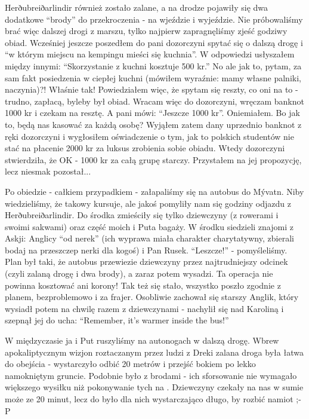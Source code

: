 Herðubreiðarlindir również zostało zalane, a na drodze pojawiły się dwa dodatkowe “brody” do przekroczenia - na wjeździe i wyjeździe. Nie próbowaliśmy brać więc dalszej drogi z marszu, tylko najpierw zapragnęliśmy zjeść godziwy obiad. Wcześniej jeszcze poszedłem do pani dozorczyni spytać się o dalszą drogę i “w którym miejscu na kempingu mieści się kuchnia”. W odpowiedzi usłyszałem między innymi: “Skorzystanie z kuchni kosztuje 500 kr.” No ale jak to, pytam, za sam fakt posiedzenia w ciepłej kuchni (mówiłem wyraźnie: mamy własne palniki, naczynia)?! Właśnie tak! Powiedziałem więc, że spytam się reszty, co oni na to - trudno, zapłacą, byleby był obiad. Wracam więc do dozorczyni, wręczam banknot 1000 kr i czekam na resztę. A pani mówi: “Jeszcze 1000 kr”. Oniemiałem. Bo jak to, będą nas kasować za każdą osobę? Wyjąłem zatem dany uprzednio banknot z ręki dozorczyni i wygłosiłem oświadczenie o tym, jak to polskich studentów nie stać na płacenie 2000 kr za luksus zrobienia sobie obiadu. Wtedy dozorczyni stwierdziła, że OK - 1000 kr za całą grupę starczy. Przystałem na jej propozycję, lecz niesmak pozostał...

Po obiedzie - całkiem przypadkiem - załapaliśmy się na autobus do Mývatn. Niby wiedzieliśmy, że takowy kursuje, ale jakoś pomyliły nam się godziny odjazdu z Herðubreiðarlindir. Do środka zmieściły się tylko dziewczyny (z rowerami i swoimi sakwami) oraz część moich i Puta bagaży. W środku siedzieli znajomi z Askji: Anglicy “od nerek” (ich wyprawa miała charakter charytatywny, zbierali bodaj na przeszczep nerki dla kogoś) i Pan Rusek. “Leszcze!” - pomyśleliśmy. Plan był taki, że autobus przewiezie dziewczyny przez najtrudniejszy odcinek (czyli zalaną drogę i dwa brody), a zaraz potem wysadzi. Ta operacja nie powinna kosztować ani korony! Tak też się stało, wszystko poszło zgodnie z planem, bezproblemowo i za frajer. Osobliwie zachował się starszy Anglik, który wysiadł potem na chwilę razem z dziewczynami - nachylił się nad Karoliną i szepnął jej do ucha: “Remember, it’s warmer inside the bus!”

W międzyczasie ja i Put ruszyliśmy na autonogach w dalszą drogę. Wbrew apokaliptycznym wizjon roztaczanym przez ludzi z Dreki zalana droga była łatwa do obejścia - wystarczyło odbić 20 metrów i przejść bokiem po lekko namokniętym gruncie. Podobnie było z brodami - ich sforsowanie nie wymagało większego wysiłku niż pokonywanie tych na . Dziewczyny czekały na nas w sumie może ze 20 minut, lecz do było dla nich wystarczająco długo, by rozbić namiot ;-P

